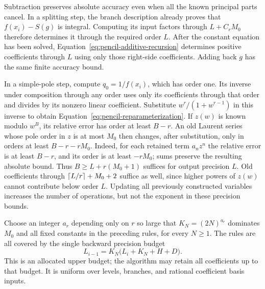 Subtraction preserves absolute accuracy even when all the known
principal parts cancel.  In a splitting step, the branch description
already proves that $f(x_i)-S(g)$ is integral.  Computing its input
factors through $L+C_rM_0$ therefore determines it through the
required order $L$.  After the constant equation has been solved,
Equation~\ref{eq:pencil-additive-recursion} determines positive
coefficients through $L$ using only those right-side coefficients.
Adding back $g$ has the same finite accuracy bound.

In a simple-pole step, compute $q_0=1/f(x_i)$, which has order one.
Its inverse under composition through any order uses only its
coefficients through that order and divides by its nonzero linear
coefficient.  Substitute $w^r/(1+w^{r-1})$ in this inverse to obtain
Equation~\ref{eq:pencil-reparameterization}.  If $z(w)$ is known modulo
$w^B$, its relative error has order at least $B-r$.  An old Laurent
series whose pole order in $z$ is at most $M_0$ then changes, after
substitution, only in orders at least $B-r-rM_0$.
Indeed, for each retained term $a_nz^n$ the relative error is at least
$B-r$, and its order is at least $-rM_0$; sums preserve the resulting
absolute bound.  Thus $B\geq L+r(M_0+1)$ suffices for output precision
$L$.  Old coefficients through $\lceil L/r\rceil+M_0+2$ suffice as well,
since higher powers of $z(w)$ cannot contribute below order $L$.
Updating all previously constructed variables increases the number of
operations, but not the exponent in these precision bounds.

Choose an integer $a_r$ depending only on $r$ so large that
$K_N=(2N)^{a_r}$ dominates $M_0$ and all fixed constants in the preceding
rules, for every $N\geq1$.  The rules are all covered by the single
backward precision budget
\begin{equation}\label{eq:pencil-precision-recurrence}
 L_{i-1}=K_N\bigl(L_i+K_N+H+D\bigr).
\end{equation}
This is an allocated upper budget; the algorithm may retain all
coefficients up to that budget.  It is uniform over levels, branches,
and rational coefficient basis inputs.

